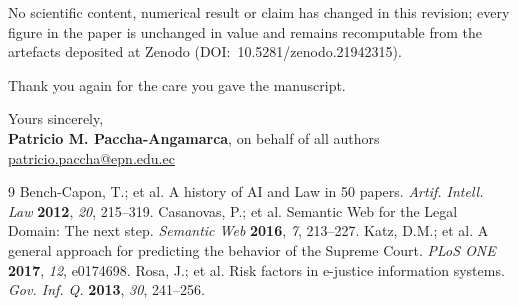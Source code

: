 \documentclass[11pt,a4paper]{article}
\begin{document}
\vspace{6pt}
\hrulefill
\vspace{4pt}

\noindent No scientific content, numerical result or claim has changed in this revision; every figure in the paper is unchanged in value and remains recomputable from the artefacts deposited at Zenodo (DOI:~10.5281/zenodo.21942315).

\vspace{6pt}
\noindent Thank you again for the care you gave the manuscript.

\vspace{12pt}
\noindent Yours sincerely,\\[14pt]
\textbf{Patricio M. Paccha-Angamarca}, on behalf of all authors\\
\href{mailto:patricio.paccha@epn.edu.ec}{patricio.paccha@epn.edu.ec}

\begin{thebibliography}{9}\footnotesize
{} Bench-Capon, T.; et al. A history of AI and Law in 50 papers. \emph{Artif. Intell. Law} \textbf{2012}, \emph{20}, 215--319.
 Casanovas, P.; et al. Semantic Web for the Legal Domain: The next step. \emph{Semantic Web} \textbf{2016}, \emph{7}, 213--227.
 Katz, D.M.; et al. A general approach for predicting the behavior of the Supreme Court. \emph{PLoS ONE} \textbf{2017}, \emph{12}, e0174698.
 Rosa, J.; et al. Risk factors in e-justice information systems. \emph{Gov. Inf. Q.} \textbf{2013}, \emph{30}, 241--256.
\end{thebibliography}
\end{document}
